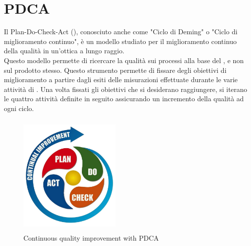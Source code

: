\documentclass[PdQ.tex]{subfiles}
\begin{document}
\hypertarget{PDCA}{\section{PDCA}}

Il Plan-Do-Check-Act (), conosciuto anche come "Ciclo di Deming" o "Ciclo di miglioramento continuo", è un modello studiato per il miglioramento continuo della qualità in un’ottica a lungo raggio.\\
Questo modello permette di ricercare la qualità sui processi alla base del , e non sul prodotto stesso.
Questo strumento permette di fissare degli obiettivi di miglioramento a partire dagli esiti delle misurazioni effettuate durante le varie attività di .
Una volta fissati gli obiettivi che si desiderano raggiungere, si iterano le quattro attività definite in seguito assicurando un incremento della qualità ad ogni ciclo.
\begin{figure}[htbp]
	\centering
	\includegraphics[height=6cm, width=5cm]{pdca.jpg}
	\caption{Continuous quality improvement with PDCA}\label{fig:pdca}
\end{figure}
\end{document}
